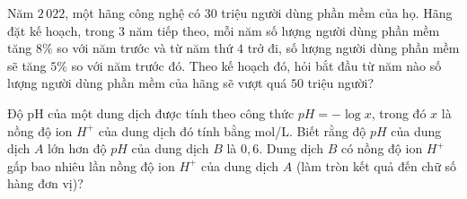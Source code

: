 \begin{bt}%

	Năm $2\,022$, một hãng công nghệ có $30$ triệu người dùng phần mềm của họ. Hãng đặt kế hoạch, trong $3$ năm tiếp theo, mỗi năm số lượng người dùng phần mềm tăng $8\%$ so với năm trước và từ năm thứ $4$ trở đi, số lượng người dùng phần mềm sẽ tăng $5\%$ so với năm trước đó. Theo kế hoạch đó, hỏi bắt đầu từ năm nào số lượng người dùng phần mềm của hãng sẽ vượt quá $50$ triệu người?
\end{bt}

\begin{bt}%

	Độ pH của một dung dịch được tính theo công thức $pH=-\log x$,  trong đó $x$ 
	là nồng độ ion $H^+$ của dung dịch đó tính bằng mol/L. Biết rằng độ $pH$ của dung dịch $A$ lớn hơn độ $pH$ của dung dịch $B$ là $0{,}6$. Dung dịch $B$ có nồng độ ion $H^+$ gấp bao nhiêu lần nồng độ ion $H^+$ của dung dịch $A$ (làm tròn kết quả đến chữ số hàng đơn vị)?
	\par {}
\end{bt}

